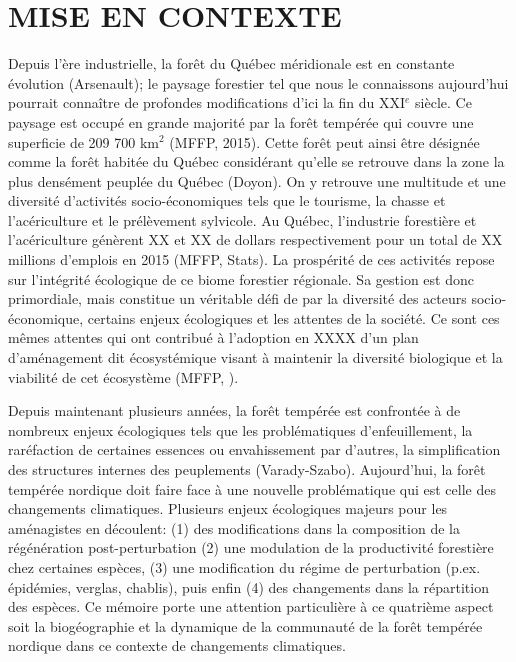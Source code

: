 
\section*{\uppercase{Mise en contexte}}

Depuis l'ère industrielle, la forêt du Québec méridionale est en constante évolution (Arsenault); le paysage forestier tel que nous le connaissons aujourd'hui pourrait connaître de profondes modifications d'ici la fin du XXI$^e$ siècle. Ce paysage est occupé en grande majorité par la forêt tempérée qui couvre une superficie de 209 700 km$^2$ (MFFP, 2015). Cette forêt peut ainsi être désignée comme la forêt habitée du Québec considérant qu'elle se retrouve dans la zone la plus densément peuplée du Québec (Doyon). On y retrouve une multitude et une diversité d'activités socio-économiques tels que le tourisme, la chasse et l'acériculture et le prélèvement sylvicole. Au Québec, l'industrie forestière et l'acériculture génèrent XX et XX de dollars respectivement pour un total de XX millions d'emplois en 2015 (MFFP, Stats). La prospérité de ces activités repose sur l'intégrité écologique de ce biome forestier régionale. Sa gestion est donc primordiale, mais constitue un véritable défi de par la diversité des acteurs socio-économique, certains enjeux écologiques et les attentes de la société. Ce sont ces mêmes attentes qui ont contribué à l'adoption en XXXX d'un plan d'aménagement dit écosystémique visant à maintenir la diversité biologique et la viabilité de cet écosystème (MFFP, ).

Depuis maintenant plusieurs années, la forêt tempérée est confrontée à de nombreux enjeux écologiques tels que les problématiques d'enfeuillement, la raréfaction de certaines essences ou envahissement par d’autres, la simplification des structures internes des peuplements (Varady-Szabo). Aujourd'hui, la forêt tempérée nordique doit faire face à une nouvelle problématique qui est celle des changements climatiques. Plusieurs enjeux écologiques majeurs pour les aménagistes en découlent: (1) des modifications dans la composition de la régénération post-perturbation (2) une modulation de la productivité forestière chez certaines espèces, (3) une modification du régime de perturbation (p.ex. épidémies, verglas, chablis), puis enfin (4) des changements dans la répartition des espèces. Ce mémoire porte une attention particulière à ce quatrième aspect soit la biogéographie et la dynamique de la communauté de la forêt tempérée nordique dans ce contexte de changements climatiques.

